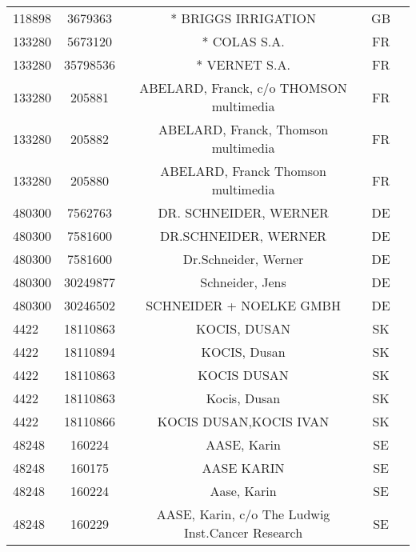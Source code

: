 \begin{longtable}{|l|c|c|c|c|}
    118898 &    3679363 &                                * BRIGGS IRRIGATION &      GB \\
    133280 &    5673120 &                                       * COLAS S.A. &      FR \\
    133280 &   35798536 &                                      * VERNET S.A. &      FR \\
    133280 &     205881 &            ABELARD, Franck, c/o THOMSON multimedia &      FR \\
    133280 &     205882 &                ABELARD, Franck, Thomson multimedia &      FR \\
    133280 &     205880 &                 ABELARD, Franck Thomson multimedia &      FR \\
    480300 &    7562763 &                              DR. SCHNEIDER, WERNER &      DE \\
    480300 &    7581600 &                               DR.SCHNEIDER, WERNER &      DE \\
    480300 &    7581600 &                               Dr.Schneider, Werner &      DE \\
    480300 &   30249877 &                                   Schneider,  Jens &      DE \\
    480300 &   30246502 &                            SCHNEIDER + NOELKE GMBH &      DE \\
      4422 &   18110863 &                                       KOCIS, DUSAN &      SK \\
      4422 &   18110894 &                                       KOCIS, Dusan &      SK \\
      4422 &   18110863 &                                        KOCIS DUSAN &      SK \\
      4422 &   18110863 &                                       Kocis, Dusan &      SK \\
      4422 &   18110866 &                             KOCIS DUSAN,KOCIS IVAN &      SK \\
     48248 &     160224 &                                        AASE, Karin &      SE \\
     48248 &     160175 &                                         AASE KARIN &      SE \\
     48248 &     160224 &                                        Aase, Karin &      SE \\
     48248 &     160229 &   AASE, Karin, c/o The Ludwig Inst.Cancer Research &      SE \\

\end{longtable}
